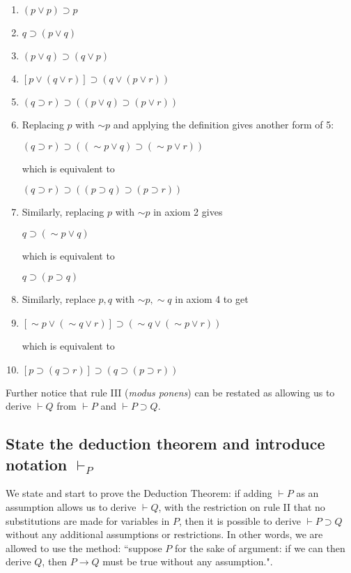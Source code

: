 \documentclass[12pt]{article}
\begin{document}
\begin{enumerate}

\item $(p \vee p) \supset p$

\item $q \supset (p \vee q)$

\item $(p \vee q) \supset (q \vee p)$

\item $[p \vee (q \vee r)] \supset (q \vee (p \vee r))$

\item $( q \supset r) \supset ((p \vee q) \supset (p \vee r))$

\item Replacing $p$ with $\sim p$ and applying the definition gives another form of 5:

 $( q \supset r) \supset ((\sim p \vee q) \supset (\sim p \vee r))$

which is equivalent to

 $( q \supset r) \supset ((p \supset q) \supset (p \supset r))$

\item  Similarly, replacing $p$ with $\sim p$ in axiom 2 gives

$q \supset (\sim p \vee q)$

which is equivalent to

$q \supset (p \supset q)$

\item Similarly, replace $p,q$ with $\sim p,\sim q$ in axiom 4 to get 

\item $[\sim p \vee (\sim q \vee r)] \supset (\sim q \vee (\sim p \vee r))$

which is equivalent to 

\item $[p \supset (q \supset  r)] \supset (q \supset  (p \supset r))$

\end{enumerate}

Further notice that rule III ({\em modus ponens}) can be restated as allowing us to derive $\vdash Q$ from $\vdash P$ and $\vdash P \supset Q$.

\subsection{State the deduction theorem and introduce notation $\vdash_P$}

We state  and start to prove the Deduction Theorem:  if adding $\vdash P$ as an assumption allows us to derive $\vdash Q$, with the restriction on rule II that no substitutions are made
for variables in $P$, then it is possible to derive $\vdash P \supset Q$ without any additional assumptions or restrictions.  In other words, we are allowed to use the method:
``suppose $P$ for the sake of argument:  if we can then derive $Q$, then $P \rightarrow Q$ must be true without any assumption.".
\end{document}
